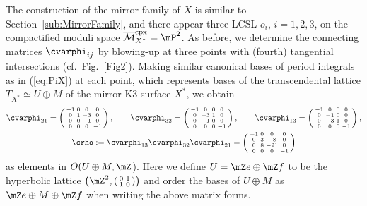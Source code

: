 \documentclass[10pt,a4paper]{amsart}
\numberwithin{equation}{section}
\begin{document}
The construction of the mirror family of $X$ is similar to Section~\ref{sub:MirrorFamily}, and there appear three LCSL $o_{i}$, $i=1,2,3$, on the compactified moduli space $\overline{\mathcal{M}}_{X^{*}}^{\rm cpx}=\mP^{2}$. As before, we determine the connecting matrices $\cvarphi_{ij}$ by blowing-up at three points with (fourth) tangential intersections (cf.\ Fig.~\ref{Fig2}). Making similar canonical bases of period integrals as
in (\ref{eq:PiX}) at each point, which represents bases of the transcendental lattice $T_{X^{*}}\simeq U\oplus M$ of the mirror K3 surface $X^{*}$, we obtain
\begin{gather*}
 \cvarphi_{21}=\left(\begin{smallmatrix}-1 & 0 & 0 & 0\\
0 & 1 & -3 & 0\\
0 & 0 & -1 & 0\\
0 & 0 & 0 & -1
\end{smallmatrix}\right),\qquad \cvarphi_{32}=\left(\begin{smallmatrix}-1 & 0 & 0 & 0\\
0 & -3 & 1 & 0\\
0 & -1 & 0 & 0\\
0 & 0 & 0 & -1
\end{smallmatrix}\right),\qquad \cvarphi_{13}=\left(\begin{smallmatrix}-1 & 0 & 0 & 0\\
0 & -1 & 0 & 0\\
0 & -3 & 1 & 0\\
0 & 0 & 0 & -1
\end{smallmatrix}\right),\\
\crho:=\cvarphi_{13}\cvarphi_{32}\cvarphi_{21}=\left(\begin{smallmatrix}-1 & 0 & 0 & 0\\
0 & 3 & -8 & 0\\
0 & 8 & -21 & 0\\
0 & 0 & 0 & -1
\end{smallmatrix}\right)
\end{gather*}
as elements in $O(U\oplus M,\mZ$). Here we define $U=\mZ e\oplus\mZ f$ to be the hyperbolic lattice $\left(\mZ^{2},\left(\begin{smallmatrix}0 & 1\\ 1 & 0 \end{smallmatrix}\right)\right)$ and order the bases of $U\oplus M$ as $\mZ e\oplus M\oplus\mZ f$ when writing the above matrix forms.
\end{document}
